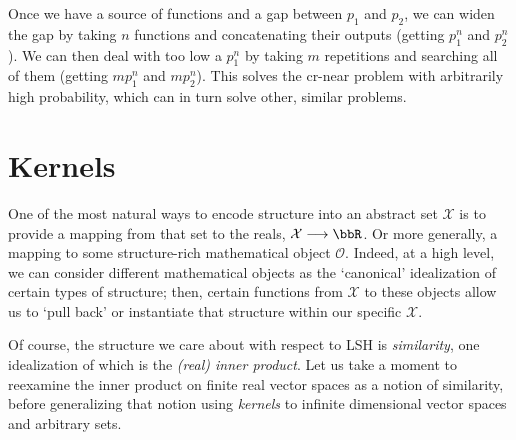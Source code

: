 \documentclass[twoside,11pt]{homework}
\renewcommand{\to}{\longrightarrow}
\begin{document}
\begin{multicols}{2}
Once we have a source of functions and a gap between $p_1$ and $p_2$,
we can widen the gap by taking $n$ functions and concatenating their
outputs (getting $p_1^n$ and $p_2^n$).  We can then deal with too low
a $p_1^n$ by taking $m$ repetitions and searching all of them (getting
$mp_1^n$ and $mp_2^n$).  This solves the cr-near problem with
arbitrarily high probability, which can in turn solve other, similar
problems.


\section{Kernels} %

One of the most natural ways to encode structure into an abstract set $\mathcal{X}$ is to provide a mapping  from that set to the reals, $\mathcal{X} \to \bbR$. Or more generally, a mapping to some structure-rich mathematical object $\mathcal{O}$. Indeed, at a high level, we can consider different mathematical objects as the `canonical' idealization of certain types of structure; then, certain functions from $\mathcal{X}$ to these objects allow us to `pull back' or instantiate that structure within our specific $\mathcal{X}$.

Of course, the structure we care about with respect to LSH is \emph{similarity}, one idealization of which is the \emph{(real) inner product}. Let us take a moment to reexamine the inner product on finite real vector spaces as a notion of similarity, before generalizing that notion using \emph{kernels} to infinite dimensional vector spaces and arbitrary sets.


\end{multicols}
\end{document}
